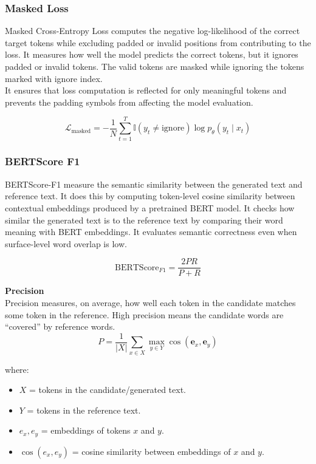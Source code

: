 \subsubsection{Masked Loss}
Masked Cross-Entropy Loss computes the negative log-likelihood of the correct target tokens while excluding padded or invalid positions from contributing to the loss. It measures how well the model predicts the correct tokens, but it ignores padded or invalid tokens. The valid tokens are masked while ignoring the tokens marked with ignore index.\\
It ensures that loss computation is reflected for only meaningful tokens and prevents the padding symbols from affecting the model evaluation.

\begin{equation}
\mathcal{L}_{\text{masked}} =
-\frac{1}{N}
\sum_{t=1}^{T}
\mathbb{I}(y_t \neq \text{ignore})
\log p_\theta(y_t \mid x_t)
\end{equation}

\subsubsection{BERTScore F1}
BERTScore-F1 measure the semantic similarity between the generated text and reference text. It does this by computing token-level cosine similarity between contextual embeddings produced by a pretrained BERT model. It checks how similar the generated text is to the reference text by comparing their word meaning with BERT embeddings. It evaluates semantic correctness even when surface-level word overlap is low.

\begin{equation}
    \text{BERTScore}_{F1} = \frac{2PR}{P + R}
\end{equation}


\textbf{Precision}\\
Precision measures, on average, how well each token in the candidate matches some token in the reference. High precision means the candidate words are “covered” by reference words.
\begin{equation}
P = \frac{1}{|X|} \sum_{x \in X} \max_{y \in Y} \cos(\mathbf{e}_x, \mathbf{e}_y)
\end{equation}

where:

\begin{itemize}
    \item $X$ = tokens in the candidate/generated text.
    \item $Y$ = tokens in the reference text.
    \item $e_x, e_y$ = embeddings of tokens $x$ and $y$.
    \item $\cos(e_x, e_y)$ = cosine similarity between embeddings of $x$ and $y$.
\end{itemize}

